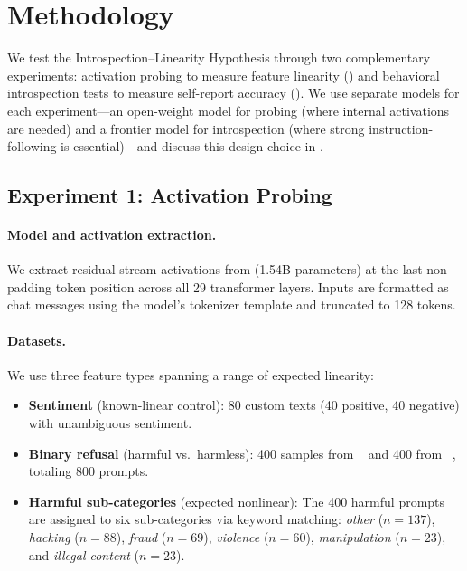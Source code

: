 \section{Methodology}
\label{sec:method}

We test the Introspection--Linearity Hypothesis through two complementary experiments: activation probing to measure feature linearity () and behavioral introspection tests to measure self-report accuracy (). We use separate models for each experiment---an open-weight model for probing (where internal activations are needed) and a frontier model for introspection (where strong instruction-following is essential)---and discuss this design choice in .

\subsection{Experiment 1: Activation Probing}
\label{sec:probing}

\paragraph{Model and activation extraction.}
We extract residual-stream activations from \qwen (1.54B parameters) at the last non-padding token position across all 29 transformer layers. Inputs are formatted as chat messages using the model's tokenizer template and truncated to 128 tokens.

\paragraph{Datasets.}
We use three feature types spanning a range of expected linearity:

\begin{itemize}[leftmargin=*,itemsep=2pt,topsep=2pt]
    \item \textbf{Sentiment} (known-linear control): 80 custom texts (40 positive, 40 negative) with unambiguous sentiment.
    \item \textbf{Binary refusal} (harmful vs.\ harmless): 400 samples from \harmless~\cite{hildebrandt2025refusal} and 400 from \harmful~\cite{hildebrandt2025refusal}, totaling 800 prompts.
    \item \textbf{Harmful sub-categories} (expected nonlinear): The 400 harmful prompts are assigned to six sub-categories via keyword matching: \textit{other} ($n{=}137$), \textit{hacking} ($n{=}88$), \textit{fraud} ($n{=}69$), \textit{violence} ($n{=}60$), \textit{manipulation} ($n{=}23$), and \textit{illegal content} ($n{=}23$).
\end{itemize}

